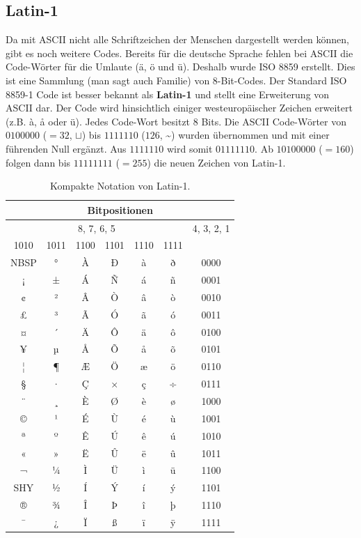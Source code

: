 \clearpage

\subsection{Latin-1}
Da mit \ac{ASCII} nicht alle Schriftzeichen der Menschen dargestellt werden können, gibt es noch weitere Codes. Bereits für die deutsche Sprache fehlen bei \ac{ASCII} die Code-Wörter für die Umlaute (ä, ö und ü). Deshalb wurde ISO 8859 erstellt. Dies ist eine Sammlung (man sagt auch Familie) von $8$-Bit-Codes. Der Standard ISO 8859-1 Code ist besser bekannt als \textbf{Latin-1} und stellt eine Erweiterung von \ac{ASCII} dar. Der Code wird hinsichtlich einiger westeuropäischer Zeichen erweitert (z.B. à, å oder ü). Jedes Code-Wort besitzt $8$ Bits. Die \ac{ASCII} Code-Wörter von $0100000$ ($=32$, $\sqcup$) bis $1111110$ ($126$, \textasciitilde) wurden übernommen und mit einer führenden Null ergänzt. Aus $1111110$ wird somit $01111110$. Ab $10100000$ ($=160$) folgen dann bis $11111111$ ($=255$) die neuen Zeichen von Latin-1.

\begin{table}[htb]
\centering
\begin{tabular}{|c|c|c|c|c|c||c|}
\hline
\multicolumn{7}{|c|}{Bitpositionen} \\ \hline
\multicolumn{6}{|c||}{8, 7, 6, 5} & 4, 3, 2, 1 \\ \hline \hline
1010 & 1011 & 1100 & 1101 & 1110 & 1111 & \\\hline
NBSP & ° & À & Ð & à & ð & 0000 \\ \hline 
¡   &  ±  &  Á   &  Ñ   &  á   &   ñ & 0001  \\ \hline 
¢   &  ²   &  Â   &   Ò  &   â  &   ò   & 0010   \\ \hline 
£   &  ³   &  Ã   &   Ó  &  ã   &    ó   & 0011    \\ \hline 
¤   &  ´   &  Ä   &   Ô  &  ä  &    ô  & 0100     \\ \hline 
¥   & µ    &  Å   &  Õ  &  å   &   õ    & 0101    \\ \hline 
¦   &   ¶  &  Æ   &  Ö  &  æ  &    ö   & 0110     \\ \hline 
§   &  ·   &  Ç   &  ×   &   ç  &   ÷   & 0111     \\ \hline 
¨   &  ¸   &   È  &   Ø  & è    &   ø    & 1000    \\ \hline 
©   &  ¹   &  É   &  Ù  &  é  &  ù   & 1001   \\ \hline 
ª   & º   & Ê   &  Ú  & ê   &  ú   & 1010       \\ \hline 
«   &  »   & Ë    &  Û   &  ë   &  û   & 1011      \\ \hline 
¬   &  ¼   & Ì    & Ü   & ì    &   ü   & 1100     \\ \hline 
SHY &  ½   &  Í   &  Ý   &  í   & ý   & 1101   \\ \hline 
®   &   ¾  &  Î   & Þ    &   î  &    þ   & 1110    \\ \hline 
¯   &  ¿   &  Ï   &  ß  &  ï   &   ÿ   & 1111     \\ \hline
\end{tabular}
\caption{Kompakte Notation von Latin-1.}
\label{table-latin-1-compact}
\end{table}

